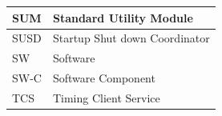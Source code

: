 \begin{longtable}{|l|l|}
\begin{minipage}{0.31\linewidth}\raggedright\vspace{.75ex}SUM\vspace{.75ex}\end{minipage} & \begin{minipage}{0.63\linewidth}\raggedright\vspace{.75ex}Standard Utility Module\vspace{.75ex}\end{minipage}\\\hline
\begin{minipage}{0.31\linewidth}\raggedright\vspace{.75ex}SUSD\vspace{.75ex}\end{minipage} & \begin{minipage}{0.63\linewidth}\raggedright\vspace{.75ex}Startup Shut down Coordinator\vspace{.75ex}\end{minipage}\\\hline
\begin{minipage}{0.31\linewidth}\raggedright\vspace{.75ex}SW\vspace{.75ex}\end{minipage} & \begin{minipage}{0.63\linewidth}\raggedright\vspace{.75ex}Software\vspace{.75ex}\end{minipage}\\\hline
\begin{minipage}{0.31\linewidth}\raggedright\vspace{.75ex}SW-C\vspace{.75ex}\end{minipage} & \begin{minipage}{0.63\linewidth}\raggedright\vspace{.75ex}Software Component\vspace{.75ex}\end{minipage}\\\hline
\begin{minipage}{0.31\linewidth}\raggedright\vspace{.75ex}TCS\vspace{.75ex}\end{minipage} & \begin{minipage}{0.63\linewidth}\raggedright\vspace{.75ex}Timing Client Service\vspace{.75ex}\end{minipage}\\\hline
\end{longtable}